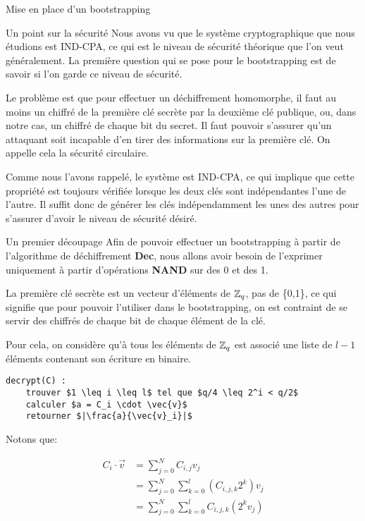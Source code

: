 \begin{section}{Mise en place d'un bootstrapping}
\begin{subsection}{Un point sur la sécurité}
	Nous avons vu que le système cryptographique que nous étudions est IND-CPA, ce qui est le niveau de sécurité théorique que l'on veut généralement. La première question qui se pose pour le bootstrapping est de savoir si l'on garde ce niveau de sécurité.

	Le problème est que pour effectuer un déchiffrement homomorphe, il faut au moins un chiffré de la première clé secrète par la deuxième clé publique, ou, dans notre cas, un chiffré de chaque bit du secret. Il faut pouvoir s'assurer qu'un attaquant soit incapable d'en tirer des informations sur la première clé. On appelle cela la sécurité circulaire.
	
	Comme nous l'avons rappelé, le système est IND-CPA, ce qui implique que cette propriété est toujours vérifiée lorsque les deux clés sont indépendantes l'une de l'autre. Il suffit donc de générer les clés indépendamment les unes des autres pour s'assurer d'avoir le niveau de sécurité désiré.
\end{subsection}
\begin{subsection}{Un premier découpage}
	Afin de pouvoir effectuer un bootstrapping à partir de l'algorithme de déchiffrement \textbf{Dec}, nous allons avoir besoin de l'exprimer uniquement à partir d'opérations \textbf{NAND} sur des 0 et des 1.
	
	La première clé secrète est un vecteur d'éléments de $\mathbb{Z}_q$, pas de \{0,1\}, ce qui signifie que pour pouvoir l'utiliser dans le bootstrapping, on est contraint de se servir des chiffrés de chaque bit de chaque élément de la clé.

	Pour cela, on considère qu'à tous les éléments de $\mathbb{Z}_q$ est associé une liste de $l-1$ éléments contenant son écriture en binaire.

\begin{lstlisting}
decrypt(C) :
	trouver $1 \leq i \leq l$ tel que $q/4 \leq 2^i < q/2$
	calculer $a = C_i \cdot \vec{v}$
	retourner $|\frac{a}{\vec{v}_i}|$
\end{lstlisting}

Notons que:

\begin{align*}
	C_i \cdot \vec{v} &= \sum_{j=0}^N C_{i,j} v_j \\
	&= \sum_{j=0}^N \sum_{k=0}^l \left( C_{i,j,k} 2^k \right) v_j \\
	&= \sum_{j=0}^N \sum_{k=0}^l C_{i,j,k} (2^k v_j)
\end{align*}


\end{subsection}
\end{section}
